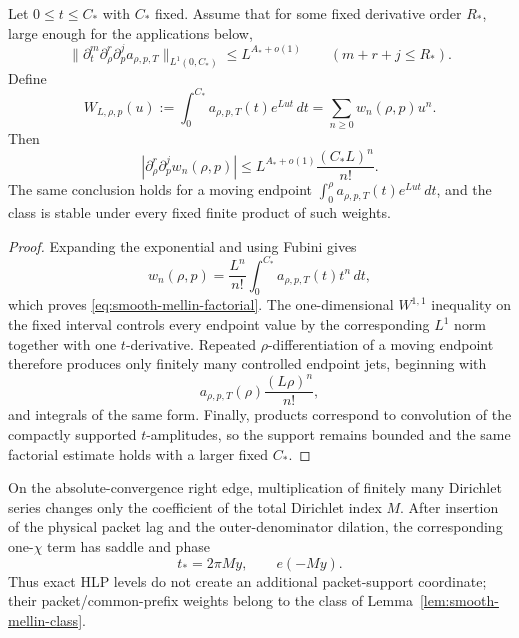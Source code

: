 \begin{lemma}
\label{lem:smooth-mellin-class}
Let $0\le t\le C_*$ with $C_*$ fixed. Assume that for some fixed derivative
order $R_*$, large enough for the applications below,
\[
\|\partial_t^m\partial_\rho^r\partial_p^j a_{\rho,p,T}\|_{L^1(0,C_*)}
\le L^{A_*+o(1)}
\qquad (m+r+j\le R_*).
\]
Define
\begin{equation}
W_{L,\rho,p}(u)
:=\int_0^{C_*}a_{\rho,p,T}(t)e^{Lut}\,dt
=\sum_{n\ge0}w_n(\rho,p)u^n.
\label{eq:smooth-mellin-weight}
\end{equation}
Then
\begin{equation}
\boxed{
|\partial_\rho^r\partial_p^j w_n(\rho,p)|
\le L^{A_*+o(1)}\frac{(C_*L)^n}{n!}.
}
\label{eq:smooth-mellin-factorial}
\end{equation}
The same conclusion holds for a moving endpoint
$\int_0^\rho a_{\rho,p,T}(t)e^{Lut}\,dt$, and the class is stable under every
fixed finite product of such weights.
\end{lemma}

\begin{proof}
Expanding the exponential and using Fubini gives
\[
w_n(\rho,p)=\frac{L^n}{n!}
\int_0^{C_*}a_{\rho,p,T}(t)t^n\,dt,
\]
which proves \eqref{eq:smooth-mellin-factorial}. The one-dimensional
$W^{1,1}$ inequality on the fixed interval controls every endpoint value by the
corresponding $L^1$ norm together with one $t$-derivative. Repeated
$\rho$-differentiation of a moving endpoint therefore produces only finitely
many controlled endpoint jets, beginning with
\[
a_{\rho,p,T}(\rho)\frac{(L\rho)^n}{n!},
\]
and integrals of the same form. Finally, products correspond to convolution
of the compactly supported $t$-amplitudes,
so the support remains bounded and the same factorial estimate holds with a
larger fixed $C_*$. \end{proof}

\begin{lemma}
\label{lem:hlp-radial-variable}
On the absolute-convergence right edge, multiplication of finitely many
Dirichlet series changes only the coefficient of the total Dirichlet index
$M$. After insertion of the physical packet lag and the outer-denominator
dilation, the corresponding one-$\chi$ term has saddle and phase
\[
t_*=2\pi My,\qquad e(-My).
\]
Thus exact HLP levels do not create an additional packet-support coordinate;
their packet/common-prefix weights belong to the class of
Lemma~\ref{lem:smooth-mellin-class}.
\end{lemma}

